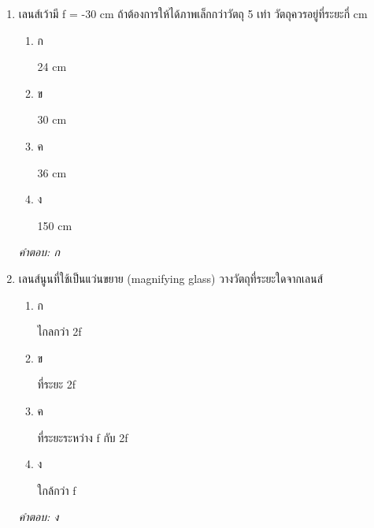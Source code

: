\documentclass[12pt]{article}
\begin{document}
\begin{enumerate}[label=\arabic*., itemsep=0.5\baselineskip, topsep=0.5\baselineskip, leftmargin=*]
\item เลนส์เว้ามี f = -30 cm ถ้าต้องการให้ได้ภาพเล็กกว่าวัตถุ 5 เท่า วัตถุควรอยู่ที่ระยะกี่ cm
\begin{enumerate}[label=\alph*)., itemsep=0.3\baselineskip, topsep=0.3\baselineskip]
\item ก\ 
\begin{minipage}[t]{0.9\linewidth}
\raggedright 24 cm
\end{minipage}
\item ข\ 
\begin{minipage}[t]{0.9\linewidth}
\raggedright 30 cm
\end{minipage}
\item ค\ 
\begin{minipage}[t]{0.9\linewidth}
\raggedright 36 cm
\end{minipage}
\item ง\ 
\begin{minipage}[t]{0.9\linewidth}
\raggedright 150 cm
\end{minipage}
\end{enumerate}
\vspace{-0.3\baselineskip}
\begin{small}
\textit{คำตอบ: ก}
\end{small}

\item เลนส์นูนที่ใช้เป็นแว่นขยาย (magnifying glass) วางวัตถุที่ระยะใดจากเลนส์
\begin{enumerate}[label=\alph*)., itemsep=0.3\baselineskip, topsep=0.3\baselineskip]
\item ก\ 
\begin{minipage}[t]{0.9\linewidth}
\raggedright ไกลกว่า 2f
\end{minipage}
\item ข\ 
\begin{minipage}[t]{0.9\linewidth}
\raggedright ที่ระยะ 2f
\end{minipage}
\item ค\ 
\begin{minipage}[t]{0.9\linewidth}
\raggedright ที่ระยะระหว่าง f กับ 2f
\end{minipage}
\item ง\ 
\begin{minipage}[t]{0.9\linewidth}
\raggedright ใกล้กว่า f
\end{minipage}
\end{enumerate}
\vspace{-0.3\baselineskip}
\begin{small}
\textit{คำตอบ: ง}
\end{small}


\end{enumerate}
\end{document}
